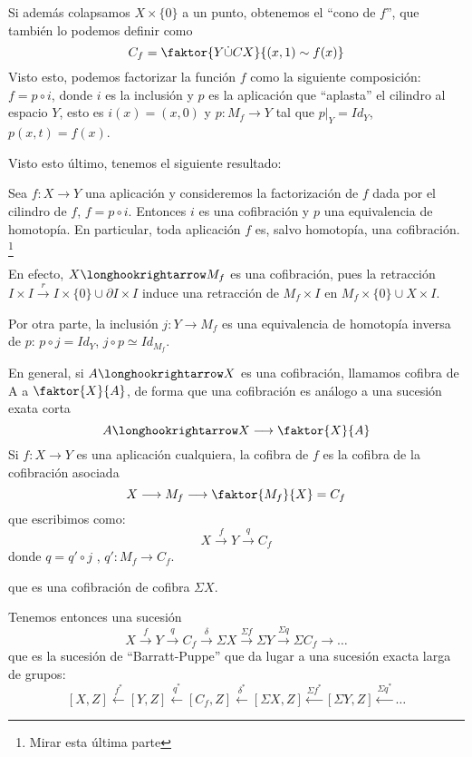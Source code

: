 Si además colapsamos $X \times \{0\}$ a un punto, obtenemos el ``cono de $f$'', que también lo podemos definir como 
\[ C_f = \faktor{Y \dot{\cup} CX}{(x,1) \sim f(x)} \]
Visto esto, podemos factorizar la función $f$ como la siguiente composición: $f = p \circ i$, donde $i$ es la inclusión y $p$ es la aplicación que ``aplasta'' el cilindro al espacio $Y$, esto es $i(x) = (x,0)$  y $p : M_f \longrightarrow Y$ tal que $p \vert_Y = Id_Y$, $p(x,t) = f(x)$. \par 
Visto esto último, tenemos el siguiente resultado:
\begin{teor}
Sea $f : X \longrightarrow Y$ una aplicación y consideremos la factorización de $f$ dada por el cilindro de $f$, $f = p \circ i$. Entonces $i$ es una cofibración y $p$ una equivalencia de homotopía. En particular, toda aplicación $f$ es, salvo homotopía, una cofibración. \footnote{Mirar esta última parte}
\end{teor}
\begin{demo}
En efecto, $X \longhookrightarrow M_f$ es una cofibración, pues la retracción $I \times I \stackrel{r}{\longrightarrow} I \times \{0\} \cup \partial I \times I$ induce una retracción de $M_f \times I$ en $M_f \times \{0\} \cup X \times  I$. \par 
Por otra parte, la inclusión $j : Y \longrightarrow M_f$ es una equivalencia de homotopía inversa de $p$: $p \circ j = Id_Y$, $j \circ p \simeq Id_{M_f}$.
\end{demo}
En general, si $A \longhookrightarrow X$ es una cofibración, llamamos cofibra de A a $\faktor{X}{A}$, de forma que una cofibración es análogo a una sucesión exata corta
\[ A \longhookrightarrow X \longrightarrow \faktor{X}{A} \]
Si $f : X \longrightarrow Y$ es una aplicación cualquiera, la cofibra de $f$ es la cofibra de la cofibración asociada
\[ X \longrightarrow M_f \longrightarrow \faktor{M_f}{X} = C_f \]
que escribimos como: 
\[ X \stackrel{f}{\longrightarrow} Y \stackrel{q}{\longrightarrow} C_f  \]
donde $q = q' \circ j$ , $q' : M_f \longrightarrow C_f$. \par 
{}
que es una cofibración de cofibra $\Sigma X$. \par
Tenemos entonces una sucesión
\[ X \stackrel{f}{\longrightarrow} Y \stackrel{q}{\longrightarrow} C_f \stackrel{\delta}{\longrightarrow} \Sigma X \stackrel{\Sigma f}{\longrightarrow} \Sigma Y \stackrel{\Sigma q}{\longrightarrow} \Sigma C_f \longrightarrow \dots \]
que es la sucesión de ``Barratt-Puppe'' que da lugar a una sucesión exacta larga de grupos:
\[ [X, Z] \stackrel{f^*}{\longleftarrow} [Y, Z] \stackrel{q^*}{\longleftarrow} [C_f, Z] \stackrel{\delta^*}{\longleftarrow} [\Sigma X, Z] \stackrel{\Sigma f^*}{\longleftarrow} [\Sigma Y, Z] \stackrel{\Sigma q^*}{\longleftarrow} \dots \]
